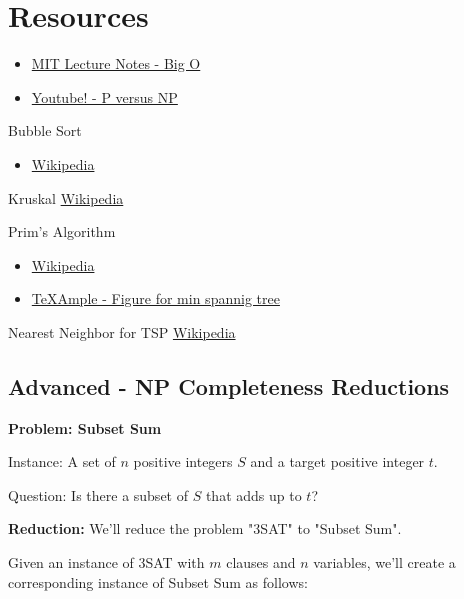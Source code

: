\section{Resources}
\begin{resource}
\begin{itemize}
\item \href{http://web.mit.edu/16.070/www/lecture/big_o.pdf}{MIT Lecture Notes - Big O}
\item \href{https://www.youtube.com/watch?v=YX40hbAHx3s}{Youtube! - P versus NP}
\end{itemize}
\end{resource}

\begin{resource}
Bubble Sort
\begin{itemize}
\item \href{https://en.wikipedia.org/wiki/Bubble_sort}{Wikipedia}
\end{itemize}
\end{resource}
\begin{resource}
Kruskal
\href{https://en.wikipedia.org/wiki/Kruskal\%27s_algorithm}{Wikipedia}
\end{resource}
\begin{resource}
Prim's Algorithm
\begin{itemize}
\item \href{https://en.wikipedia.org/wiki/Prim\%27s_algorithm}{Wikipedia}
\item \href{http://www.texample.net/tikz/examples/prims-algorithm/}{TeXAmple - Figure for min spannig tree}
\end{itemize}
\end{resource}
\begin{resource}
Nearest Neighbor for TSP
\href{https://en.wikipedia.org/wiki/Nearest_neighbour_algorithm}{Wikipedia}
\end{resource}

\subsection{Advanced - NP Completeness Reductions}
\textbf{Problem: Subset Sum}

Instance: A set of $n$ positive integers $S$ and a target positive integer $t$.

Question: Is there a subset of $S$ that adds up to $t$?

\textbf{Reduction:} We'll reduce the problem "3SAT" to "Subset Sum".

Given an instance of 3SAT with $m$ clauses and $n$ variables, we'll create a corresponding instance of Subset Sum as follows:

